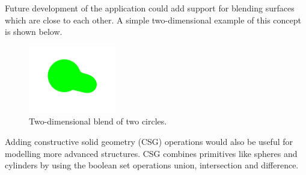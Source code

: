 \documentclass[conference]{acmsiggraph}
\begin{document}
Future development of the application could add support for blending surfaces
which are close to each other.  A simple two-dimensional example of this concept
is shown below.

\begin{figure}[ht]
  \centering
  \includegraphics[width=1.5in]{figures/blend2d.png}
  \caption{Two-dimensional blend of two circles.}
\end{figure}

Adding constructive solid geometry (CSG) operations would also be useful
for modelling more advanced structures.  CSG combines primitives like 
spheres and cylinders by using the boolean set operations union,
intersection and difference.



\end{document}
